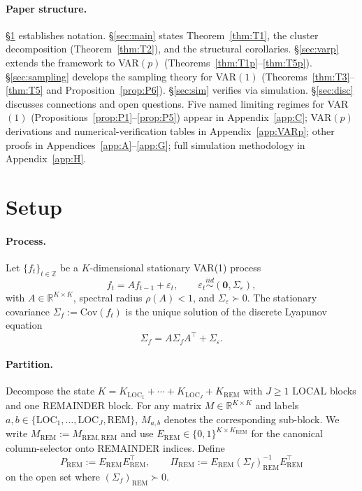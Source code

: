 \documentclass[11pt,letterpaper]{article}
\theoremstyle{remark}
\newcommand{\REM}{\mathrm{REM}}
\newcommand{\LOC}{\mathrm{LOC}}
\newcommand{\PiREM}{\Pi_{\REM}}
\newcommand{\PREM}{P_{\REM}}
\newcommand{\Cov}{\mathrm{Cov}}
\begin{document}
\paragraph{Paper structure.} \S\ref{sec:setup} establishes notation. \S\ref{sec:main} states Theorem~\ref{thm:T1}, the cluster decomposition (Theorem~\ref{thm:T2}), and the structural corollaries. \S\ref{sec:varp} extends the framework to VAR$(p)$ (Theorems~\ref{thm:T1p}--\ref{thm:T5p}). \S\ref{sec:sampling} develops the sampling theory for VAR$(1)$ (Theorems~\ref{thm:T3}--\ref{thm:T5} and Proposition~\ref{prop:P6}). \S\ref{sec:sim} verifies via simulation. \S\ref{sec:disc} discusses connections and open questions. Five named limiting regimes for VAR$(1)$ (Propositions~\ref{prop:P1}--\ref{prop:P5}) appear in Appendix~\ref{app:C}; VAR$(p)$ derivations and numerical-verification tables in Appendix~\ref{app:VARp}; other proofs in Appendices~\ref{app:A}--\ref{app:G}; full simulation methodology in Appendix~\ref{app:H}.

\section{Setup}\label{sec:setup}

\paragraph{Process.} Let $\{f_t\}_{t \in \mathbb{Z}}$ be a $K$-dimensional stationary VAR(1) process
\begin{equation}\label{eq:VAR1}
f_t = A f_{t-1} + \varepsilon_t, \qquad \varepsilon_t \stackrel{iid}{\sim} (\mathbf{0}, \Sigma_\varepsilon),
\end{equation}
with $A \in \mathbb{R}^{K \times K}$, spectral radius $\rho(A) < 1$, and $\Sigma_\varepsilon \succ 0$. The stationary covariance $\Sigma_f := \Cov(f_t)$ is the unique solution of the discrete Lyapunov equation
\begin{equation}\label{eq:Lyap}
\Sigma_f = A \Sigma_f A^\top + \Sigma_\varepsilon.
\end{equation}

\paragraph{Partition.} Decompose the state $K = K_{\LOC_1} + \cdots + K_{\LOC_J} + K_\REM$ with $J \ge 1$ LOCAL blocks and one REMAINDER block. For any matrix $M \in \mathbb{R}^{K \times K}$ and labels $a, b \in \{\LOC_1, \ldots, \LOC_J, \REM\}$, $M_{a, b}$ denotes the corresponding sub-block. We write $M_\REM := M_{\REM, \REM}$ and use $E_\REM \in \{0, 1\}^{K \times K_\REM}$ for the canonical column-selector onto REMAINDER indices. Define
\begin{equation*}
\PREM := E_\REM E_\REM^\top, \qquad \PiREM := E_\REM (\Sigma_f)_\REM^{-1} E_\REM^\top
\end{equation*}
on the open set where $(\Sigma_f)_\REM \succ 0$.
\end{document}
